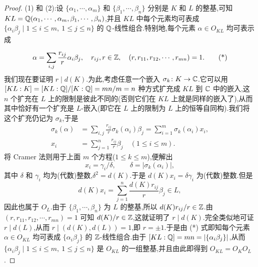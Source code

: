 \begin{proof}
\begin{sloppypar}
(1) 和 (2):设 $\{\alpha_1,\cdots,\alpha_m\}$ 和 $\{\beta_1,\cdots,\beta_n\}$ 分别是 $K$ 和 $L$ 的整基,\allowbreak 可知 $KL=\mathbb{Q}(\alpha_1,\cdots,\alpha_m,\beta_1,\cdots,\beta_n)$,\allowbreak 并且 $KL$ 中每个元素均可表成 $\{\alpha_i\beta_j\mid 1\leqslant i\leqslant m,\ 1\leqslant j\leqslant n\}$ 的 $\mathbb{Q}$-线性组合.特别地,每个元素 $\alpha\in O_{KL}$ 均可表示成
\end{sloppypar}
\begin{equation}  \alpha=\sum_{i,j}\frac{r_{ij}}{r}\alpha_i\beta_j,\quad r_{ij},r\in\mathbb{Z},\quad (r,r_{11},r_{12},\cdots,r_{mn})=1.\tag{*}\end{equation}
我们现在要证明 $r\mid d(K)$.为此,考虑任意一个嵌入 $\sigma_k\colon K\to\mathbb{C}$.它可以用 $[KL:K]=[KL:\mathbb{Q}]/[K:\mathbb{Q}]=mn/m=n$ 种方式扩充成 $KL$ 到 $\mathbb{C}$ 中的嵌入,这 $n$ 个扩充在 $L$ 上的限制是彼此不同的(否则它们在 $KL$ 上就是同样的嵌入了),从而其中恰好有一个扩充是 $L$-嵌入(即它在 $L$ 上的限制为 $L$ 上的恒等自同构).我们将这个扩充仍记为 $\sigma_k$,于是
\begin{align*}
  \sigma_k(\alpha)&=\sum_{i,j}\frac{r_{ij}}{r}\sigma_k(\alpha_i)\beta_j=\sum_{i=1}^{m}\sigma_k(\alpha_i)x_i,\\
  x_i&=\sum_{j=1}^{n}\frac{r_{ij}}{r}\beta_j\quad (1\leqslant i\leqslant m).
\end{align*}
将 Cramer 法则用于上面 $m$ 个方程($1\leqslant k\leqslant m$),便解出
\[
  x_i=\gamma_i/\delta,\qquad \delta=|\sigma_k(\alpha_i)|,
\]
其中 $\delta$ 和 $\gamma_i$ 均为(代数)整数,$\delta^2=d(K)$.于是 $d(K)x_i=\delta\gamma_i$ 为(代数)整数.但是
\[
  d(K)x_i=\sum_{j=1}^{n}\frac{d(K)r_{ij}}{r}\beta_j\in L,
\]
因此也属于 $O_L$.由于 $\{\beta_1,\cdots,\beta_n\}$ 为 $L$ 的整基,所以 $d(K)r_{ij}/r\in\mathbb{Z}$.由 $(r,r_{11},r_{12},\cdots,r_{mn})=1$ 可知 $d(K)/r\in\mathbb{Z}$,这就证明了 $r\mid d(K)$.完全类似地可证 $r\mid d(L)$,从而 $r\mid(d(K),d(L))=1$,即 $r=\pm1$.于是由 (*) 式即知每个元素 $\alpha\in O_{KL}$ 均可表成 $\{\alpha_i\beta_j\}$ 的 $\mathbb{Z}$-线性组合.由于 $[KL:\mathbb{Q}]=mn=|\{\alpha_i\beta_j\}|$,从而 $\{\alpha_i\beta_j\mid 1\leqslant i\leqslant m,\ 1\leqslant j\leqslant n\}$ 是 $O_{KL}$ 的一组整基,并且由此即得到 $O_{KL}=O_KO_L$.


\end{proof}
